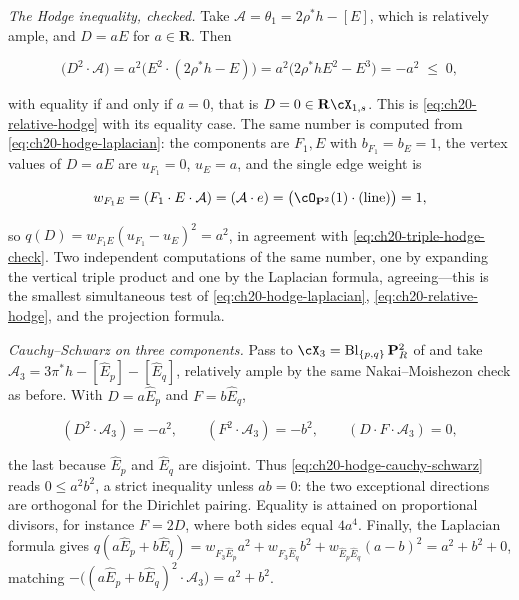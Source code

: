\begin{example}
\emph{The Hodge inequality, checked.}  Take $\mathcal A=\theta_1=2\rho^*h-[E]$,
which is relatively ample, and $D=aE$ for $a\in\mathbf R$.  Then

\begin{equation}
\label{eq:ch20-triple-hodge-check}
 \bigl(D^2\cdot\mathcal A\bigr)
 =a^2\bigl(E^2\cdot(2\rho^*h-E)\bigr)
 =a^2\bigl(2\rho^*hE^2-E^3\bigr)
 =-a^2\;\leq\;0 ,
\end{equation}

with equality if and only if $a=0$, that is $D=0\in\mathbf R\cX_{1,s}$.
This is \eqref{eq:ch20-relative-hodge} with its equality case.  The same
number is computed from \eqref{eq:ch20-hodge-laplacian}: the components are
$F_1,E$ with $b_{F_1}=b_E=1$, the vertex values of $D=aE$ are
$u_{F_1}=0$, $u_E=a$, and the single edge weight is

\[
 w_{F_1E}=(F_1\cdot E\cdot\mathcal A)=(\mathcal A\cdot e)
 =\bigl(\cO_{\mathbf P^2}(1)\cdot(\text{line})\bigr)=1 ,
\]

so $q(D)=w_{F_1E}(u_{F_1}-u_E)^2=a^2$, in agreement with
\eqref{eq:ch20-triple-hodge-check}.  Two independent computations of the
same number, one by expanding the vertical triple product and one by the
Laplacian formula,
agreeing---this is the smallest simultaneous test of
\eqref{eq:ch20-hodge-laplacian}, \eqref{eq:ch20-relative-hodge}, and the
projection formula.

\emph{Cauchy--Schwarz on three components.}  Pass to
$\cX_3=\operatorname{Bl}_{\{p,q\}}\mathbf P^2_R$ of
 and take
$\mathcal A_3=3\pi^*h-[\widehat E_p]-[\widehat E_q]$, relatively ample by
the same Nakai--Moishezon check as before.  With
$D=a\widehat E_p$ and $F=b\widehat E_q$,

\[
 (D^2\cdot\mathcal A_3)=-a^2,\qquad
 (F^2\cdot\mathcal A_3)=-b^2,\qquad
 (D\cdot F\cdot\mathcal A_3)=0 ,
\]

the last because $\widehat E_p$ and $\widehat E_q$ are disjoint.  Thus
\eqref{eq:ch20-hodge-cauchy-schwarz} reads $0\leq a^2b^2$, a strict
inequality unless $ab=0$: the two exceptional directions are orthogonal
for the Dirichlet pairing.  Equality is attained on proportional divisors,
for instance $F=2D$, where both sides equal $4a^4$.  Finally, the
Laplacian formula gives
$q(a\widehat E_p+b\widehat E_q)=w_{F_3\widehat E_p}a^2
 +w_{F_3\widehat E_q}b^2+w_{\widehat E_p\widehat E_q}(a-b)^2
 =a^2+b^2+0$, matching
$-\bigl((a\widehat E_p+b\widehat E_q)^2\cdot\mathcal A_3\bigr)=a^2+b^2$.
\end{example}

